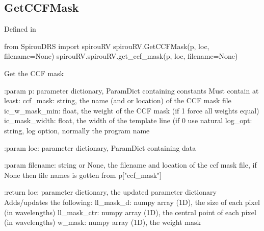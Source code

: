 \begin{minipage}{\textwidth}
\subsection{GetCCFMask}

Defined in \spirouRV{}

\begin{pythonbox}
from SpirouDRS import spirouRV
spirouRV.GetCCFMask(p, loc, filename=None)
spirouRV.spirouRV.get_ccf_mask(p, loc, filename=None)
\end{pythonbox}

\begin{pythondocstring}
Get the CCF mask

:param p: parameter dictionary, ParamDict containing constants
    Must contain at least:
            ccf_mask: string, the name (and or location) of the CCF
                      mask file
            ic_w_mask_min: float, the weight of the CCF mask (if 1 force
                           all weights equal)
            ic_mask_width: float, the width of the template line
                           (if 0 use natural
            log_opt: string, log option, normally the program name

:param loc: parameter dictionary, ParamDict containing data

:param filename: string or None, the filename and location of the ccf mask
                 file, if None then file names is gotten from p["ccf_mask"]

:return loc: parameter dictionary, the updated parameter dictionary
        Adds/updates the following:
            ll_mask_d: numpy array (1D), the size of each pixel
                       (in wavelengths)
            ll_mask_ctr: numpy array (1D), the central point of each pixel
                         (in wavelengths)
            w_mask: numpy array (1D), the weight mask
\end{pythondocstring}
\end{minipage}

